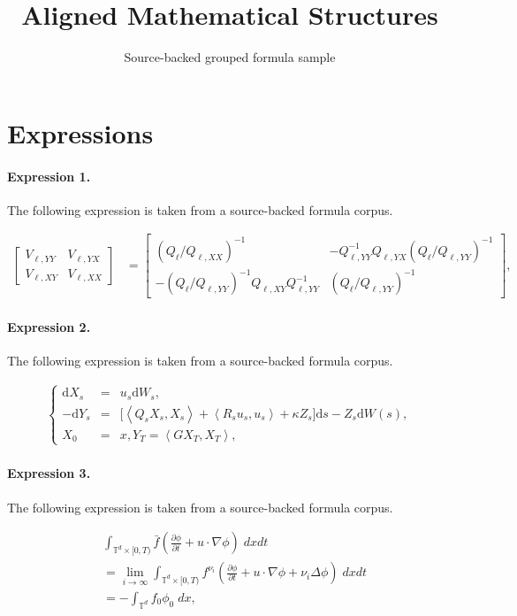 \documentclass[11pt]{article}
\title{Aligned Mathematical Structures}
\author{Source-backed grouped formula sample}
\date{}
\begin{document}
\maketitle
\section{Expressions}
\paragraph{Expression 1.} The following expression is taken from a source-backed formula corpus.

\begin{align*}\begin{bmatrix} V_{\ell, YY} & V_{\ell, YX} \\ V_{\ell, XY} & V_{\ell, XX} \end{bmatrix} & = \begin{bmatrix}(Q_{\ell} / Q_{\ell, XX})^{-1} & - Q_{\ell, YY}^{-1} Q_{\ell, YX} (Q_{\ell} / Q_{\ell, YY})^{-1} \\- (Q_{\ell} / Q_{\ell, YY})^{-1} Q_{\ell, XY} Q_{\ell, YY}^{-1} & (Q_{\ell} / Q_{\ell, YY})^{-1} \end{bmatrix} ,\end{align*}

\paragraph{Expression 2.} The following expression is taken from a source-backed formula corpus.

\begin{align*}\left\{\begin{array}{rcl}\mathrm{d}X_{s} & = & u_{s}\mathrm{d}W_{s}, \\-\mathrm{d}Y_{s} & = & \Big [\left\langle Q_{s}X_{s},X_{s}\right\rangle+\left\langle R_{s}u_{s},u_{s}\right\rangle +\kappa Z_{s}\Big ]\mathrm{d}s-Z_{s}\mathrm{d}W(s), \\X_{0} & = & x,Y_{T}=\left\langle GX_{T},X_{T}\right\rangle ,\end{array}\right. \end{align*}

\paragraph{Expression 3.} The following expression is taken from a source-backed formula corpus.

\begin{align*}& \int_{\mathbb{T}^d\times[0,T)} \bar{f} \left(\frac{\partial \phi}{\partial t} + u\cdot\nabla \phi\right) \; dxdt \\& = \lim_{i\to\infty} \int_{\mathbb{T}^d\times[0,T)} f^{\nu_i} \left(\frac{\partial \phi}{\partial t} + u\cdot\nabla \phi + \nu_i \Delta \phi\right) \; dxdt \\& = - \int_{\mathbb{T}^d} f_0 \phi_0 \; dx,\end{align*}
\end{document}
